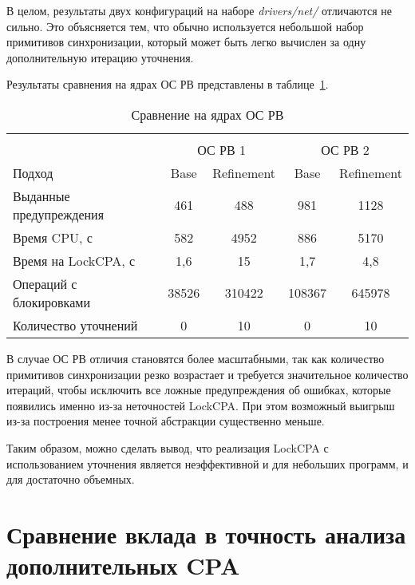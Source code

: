 В целом, результаты двух конфигураций на наборе \textit{drivers/net/} отличаются не сильно.
Это объясняется тем, что обычно используется небольшой набор примитивов синхронизации, который может быть легко вычислен за одну дополнительную итерацию уточнения.

Результаты сравнения на ядрах ОС РВ представлены в таблице~\ref{table-os-lock-refinement}.

  \begin{table}[h]\footnotesize \centering
    \caption{Сравнение на ядрах ОС РВ}
  	\label{table-os-lock-refinement}
    \begin{tabular}{ | l | c | c | c | c | }
      \hline
      		& 		\multicolumn{4}{c|}{\combatmode}  \\
      		& 			 \multicolumn{2}{c|}{ОС РВ 1} & 		\multicolumn{2}{c|}{ОС РВ 2}\\
      Подход         					& Base  & Refinement  	& Base  & Refinement 	\\ \hline
      Выданные предупреждения			& 461   & 488    		& 981   & 1128  		\\ 
  	  Время CPU, с 						& 582   & 4952 			& 886   & 5170  		\\ 
  \hspace{0.5cm} Время на LockCPA, с	& 1,6   & 15    		& 1,7   & 4,8  			\\ \hline
      Операций с блокировками  			& 38526	& 310422   		& 108367 & 645978  		\\ 
      Количество уточнений  			& 0   	& 10   			& 0   	& 10  			\\ 
      \hline
    \end{tabular}
  \end{table}

В случае ОС РВ отличия становятся более масштабными, так как количество примитивов синхронизации резко возрастает и требуется значительное количество итераций, чтобы исключить все ложные предупреждения об ошибках, которые появились именно из-за неточностей LockCPA.
При этом возможный выигрыш из-за построения менее точной абстракции существенно меньше. 

Таким образом, можно сделать вывод, что реализация LockCPA с использованием уточнения является неэффективной и для небольших программ, и для достаточно объемных.



\section{Сравнение вклада в точность анализа дополнительных CPA}

